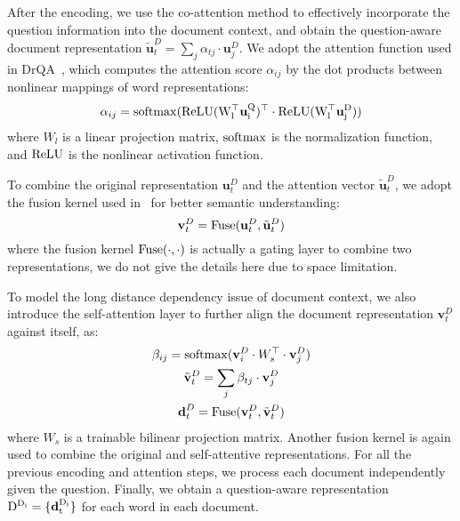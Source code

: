 \documentclass[letterpaper]{article} \usepackage{aaai19}  \usepackage{graphicx}
\begin{document}
After the encoding, we use the co-attention method to effectively incorporate the question information into the document context, and obtain the question-aware document representation $\tilde{\textbf{u}}_t^D=\sum_{j}\alpha_{tj}\cdot \textbf{u}_j^D$. We adopt the attention function used in DrQA~\cite{chen2017reading}, which computes the attention score $\alpha_{ij}$ by the dot products between nonlinear mappings of word representations:
\begin{equation}\label{equ:3}
 \alpha_{ij} =\rm{softmax}({\rm ReLU}(W^\top_{l} \textbf{u}_i^Q)^\top \cdot {\rm ReLU}(W^\top_{l} \textbf{u}_j^D)) \\
\end{equation}
where $W_{l}$ is a linear projection matrix, $\rm softmax$ is the normalization function, and $\rm ReLU$ is the nonlinear activation function. 

To combine the original representation $\textbf{u}_t^D$ and the attention vector $\tilde{\textbf{u}}_t^D$, we adopt the fusion kernel used in~\cite{wang2018alibaba} for better semantic understanding: 
\begin{equation} \label{equ:4}
  \textbf{v}_t^D={\rm Fuse}(\textbf{u}_t^D,\tilde{\textbf{u}}_t^D)
\end{equation}
where the fusion kernel $\rm Fuse(\cdot, \cdot)$ is actually a gating layer to combine two representations, we do not give the details here due to space limitation.

To model the long distance dependency issue of document context, we also introduce the self-attention layer to further align the document representation $\textbf{v}_t^D$ against itself, as:
\begin{equation} \label{equ:5}
\begin{gathered}
\beta_{ij}={\rm softmax}(\textbf{v}_i^D\cdot W_s^\top\cdot \textbf{v}_j^D) \\
\tilde{\textbf{v}}_t^D=\sum_{j}\beta_{tj}\cdot \textbf{v}_j^D \\
\textbf{d}_t^D={\rm Fuse}(\textbf{v}_t^D,\tilde{\textbf{v}}_t^D)
\end{gathered}
\end{equation}
where $W_s$ is a trainable bilinear projection matrix. Another fusion kernel is again used to combine the original and self-attentive representations. For all the previous encoding and attention steps,  we process each document independently given the question. Finally, we obtain a question-aware representation $\rm{D}^{D_i}=\{\textbf{d}_t^{D_i}\}$ for each word in each document. 
\end{document}

